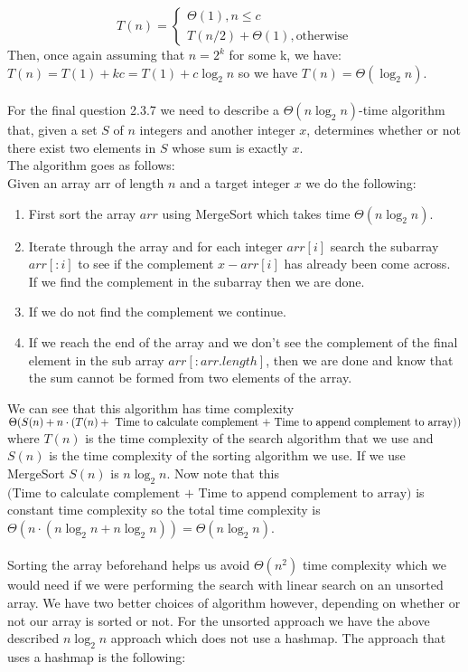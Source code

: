 \documentclass{scrartcl}
\theoremstyle{definition}
\theoremstyle{definition}
\theoremstyle{remark}
\numberwithin{equation}{section}
\begin{document}
$$T(n)=\begin{cases}
    \Theta(1), n\leq c\\
    T(n/2)+\Theta(1), \text{otherwise}
\end{cases}$$
Then, once again assuming that $n=2^k$ for some k, we have:
$T(n)=T(1)+kc=T(1) + c\log_2n$ so we have $T(n)=\Theta(\log_2n)$.\\
\\
For the final question 2.3.7 we need to describe a $\Theta(n\log_2n)$-time algorithm that, given a set $S$ of $n$ integers and another integer $x$, determines whether or not there exist two elements in $S$ whose sum is exactly $x$.\\
The algorithm goes as follows:\\
Given an array arr of length $n$ and a target integer $x$ we do the following:
\begin{enumerate}
    \item First sort the array $arr$ using MergeSort which takes time $\Theta(n\log_2n)$.
    \item Iterate through the array and for each integer $arr[i]$ search the subarray $arr[:i]$ to see if the complement $x - arr[i]$ has already been come across. If we find the complement in the subarray then we are done. 
    \item If we do not find the complement we continue.
    \item If we reach the end of the array and we don't see the complement of the final element in the sub array $arr[:arr.length]$, then we are done and know that the sum cannot be formed from two elements of the array.
\end{enumerate}
We can see that this algorithm has time complexity $\Theta(S(n) + n\cdot(T(n) + \\ \text{ Time to calculate complement + Time to append complement to array}))$ where $T(n)$ is the time complexity of the search algorithm that we use and $S(n)$ is the time complexity of the sorting algorithm we use. If we use MergeSort $S(n)$ is $n\log_2n$. Now note that this $\text{(Time to calculate complement + Time to append complement to array})$ is constant time complexity so the total time complexity is $\Theta(n\cdot(n\log_2n +n\log_2n))=\Theta(n\log_2n)$.\\
\\
Sorting the array beforehand helps us avoid $\Theta(n^2)$ time complexity which we would need if we were performing the search with linear search on an unsorted array. We have two better choices of algorithm however, depending on whether or not our array is sorted or not. For the unsorted approach we have the above described $n\log_2n$ approach which does not use a hashmap. The approach that uses a hashmap is the following:
\end{document}
